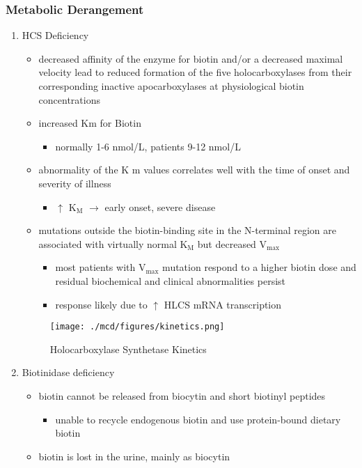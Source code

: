 \documentclass{scrartcl}
\begin{document}
\subsubsection{Metabolic Derangement}
\label{sec:org8969a7d}
\begin{enumerate}
\item HCS Deficiency
\label{sec:org9bd38c8}
\begin{itemize}
\item decreased affinity of the enzyme for biotin and/or a decreased
maximal velocity lead to reduced formation of the five
holocarboxylases from their corresponding inactive apocarboxylases
at physiological biotin concentrations
\item increased Km for Biotin
\begin{itemize}
\item normally 1-6 nmol/L, patients 9-12 nmol/L
\end{itemize}
\item abnormality of the K m values correlates well with the time of onset
and severity of illness
\begin{itemize}
\item \(\uparrow\) K\(_{\text{M}}\) \(\to\) early onset, severe disease
\end{itemize}

\item mutations outside the biotin-binding site in the N-terminal region
are associated with virtually normal K\(_{\text{M}}\) but decreased V\(_{\text{max}}\)
\begin{itemize}
\item most patients with V\(_{\text{max}}\) mutation respond to a higher biotin
dose and residual biochemical and clinical abnormalities persist
\item response likely due to \(\uparrow\) HLCS mRNA transcription
\end{itemize}
\end{itemize}

\begin{figure}[htbp]
\centering
\texttt{[image: ./mcd/figures/kinetics.png]}
\caption[Kinetics]{\label{fig:orge1ae745}
Holocarboxylase Synthetase Kinetics}
\end{figure}

\item Biotinidase deficiency
\label{sec:org6e574b1}
\begin{itemize}
\item biotin cannot be released from biocytin and short biotinyl
peptides
\begin{itemize}
\item unable to recycle endogenous biotin and use protein-bound dietary biotin
\end{itemize}
\item biotin is lost in the urine, mainly as biocytin
\end{itemize}
\end{enumerate}
\end{document}

